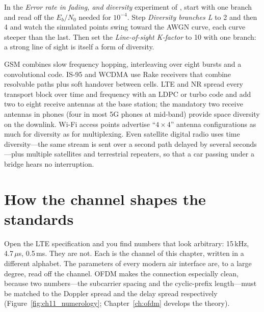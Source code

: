 \begin{tryit}
In the \emph{Error rate in fading, and diversity} experiment of , start with
one branch and read off the $E_b/N_0$ needed for $10^{-4}$. Step \emph{Diversity branches L} to 2 and
then 4 and watch the simulated points swing toward the AWGN curve, each curve steeper than the last.
Then set the \emph{Line-of-sight K-factor} to 10 with one branch: a strong line of sight is itself a form of diversity.
\end{tryit}

\begin{inpractice}
GSM combines slow frequency hopping, interleaving over eight bursts and a convolutional code.
IS-95 and WCDMA use Rake receivers that combine resolvable paths plus soft handover between cells.
LTE and NR spread every transport block over time and frequency with an LDPC or turbo code and add
two to eight receive antennas at the base station; the mandatory two receive antennas in phones
(four in most 5G phones at mid-band) provide space diversity on the downlink. Wi-Fi access points
advertise ``$4\times4$'' antenna configurations as much for diversity as for multiplexing. Even
satellite digital radio uses time diversity---the same stream is sent over a second path delayed by
several seconds---plus multiple satellites and terrestrial repeaters, so that a car passing under a bridge
hears no interruption.
\end{inpractice}

\section{How the channel shapes the standards}
\label{sec:ch11:standards}

Open the LTE specification and you find numbers that look arbitrary: 15\,kHz, 4.7\,$\mu$s, 0.5\,ms.
They are not. Each is the channel of this chapter, written in a different alphabet. The parameters
of every modern air interface are, to a large degree, read off the channel. OFDM makes the
connection especially clean, because two numbers---the subcarrier spacing and the cyclic-prefix
length---must be matched to the Doppler spread and the delay spread respectively
(Figure~\ref{fig:ch11_numerology}; Chapter~\ref{ch:ofdm} develops the theory).

